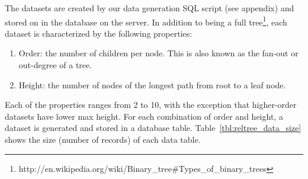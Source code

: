 The datasets are created by our data generation SQL script (see appendix) and stored on in the database on the server. In addition to being a full tree\footnote{http://en.wikipedia.org/wiki/Binary\_tree\#Types\_of\_binary\_trees}, each dataset is characterized by the following properties:

\begin{enumerate}
\item Order: the number of children per node. This is also known as the fan-out or out-degree of a tree.
\item Height: the number of nodes of the longest path from root to a leaf node.
\end{enumerate} 

Each of the properties ranges from 2 to 10, with the exception that higher-order datasets have lower max height. For each combination of order and height, a dataset is generated and stored in a database table. Table~\ref{tbl:reltree_data_size} shows the size (number of records) of each data table.

\newcommand*\rot{\rotatebox{90}}

